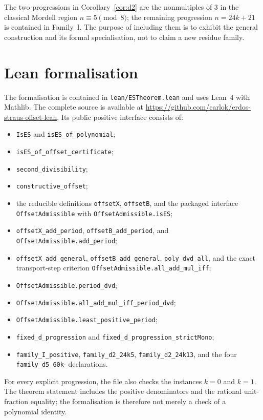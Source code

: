\documentclass[11pt]{article}
\theoremstyle{remark}
\begin{document}
The two progressions in Corollary~\ref{cor:d2} are the nonmultiples of \(3\)
in the classical Mordell region \(n\equiv5\pmod8\); the remaining progression
\(n=24k+21\) is contained in Family~I.  The purpose of including them is to
exhibit the general construction and its formal specialisation, not to claim a
new residue family.

\section{Lean formalisation}

The formalisation is contained in \texttt{lean/ESTheorem.lean} and uses Lean~4
with Mathlib.  The complete source is available at
\url{https://github.com/carlok/erdos-straus-offset-lean}.  Its public positive
interface consists of:
\begin{itemize}
  \item \texttt{IsES} and \texttt{isES\_of\_polynomial};
  \item \texttt{isES\_of\_offset\_certificate};
  \item \texttt{second\_divisibility};
  \item \texttt{constructive\_offset};
  \item the reducible definitions \texttt{offsetX}, \texttt{offsetB}, and the
        packaged interface \texttt{OffsetAdmissible} with
        \texttt{OffsetAdmissible.isES};
  \item \texttt{offsetX\_add\_period}, \texttt{offsetB\_add\_period}, and
        \texttt{OffsetAdmissible.add\_period};
  \item \texttt{offsetX\_add\_general}, \texttt{offsetB\_add\_general},
        \texttt{poly\_dvd\_all}, and the exact transport-step criterion
        \texttt{OffsetAdmissible.all\_add\_mul\_iff};
  \item \texttt{OffsetAdmissible.period\_dvd};
  \item \texttt{OffsetAdmissible.all\_add\_mul\_iff\_period\_dvd};
  \item \texttt{OffsetAdmissible.least\_positive\_period};
  \item \texttt{fixed\_d\_progression} and
        \texttt{fixed\_d\_progression\_strictMono};
  \item \texttt{family\_I\_positive}, \texttt{family\_d2\_24k5},
        \texttt{family\_d2\_24k13}, and the four
        \texttt{family\_d5\_60k\(\cdot\)} declarations.
\end{itemize}
For every explicit progression, the file also checks the instances \(k=0\) and
\(k=1\).  The theorem statement includes the positive denominators and the
rational unit-fraction equality; the formalisation is therefore not merely a
check of a polynomial identity.
\end{document}
